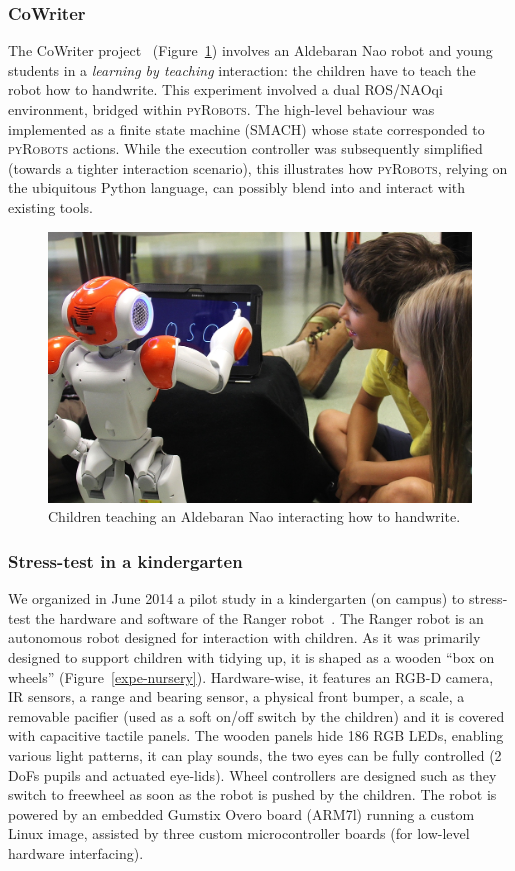 \documentclass[a4paper, 10pt, conference]{ieeeconf}      %
\newcommand{\pyRobots}{\textsc{pyRobots}}
\begin{document}
\subsubsection{CoWriter} The {\sc CoWriter} project~\cite{hood2015those}
(Figure~\ref{expe-cowriter}) involves an Aldebaran Nao robot and young students
in a \emph{learning by teaching} interaction: the children have to teach the
robot how to handwrite. This experiment involved a dual ROS/NAOqi environment,
bridged within \pyRobots{}. The high-level behaviour was implemented as a finite
state machine ({\sc SMACH}) whose state corresponded to \pyRobots{} actions.
While the execution controller was subsequently simplified (towards a tighter
interaction scenario), this illustrates how \pyRobots{}, relying on the
ubiquitous Python language, can possibly blend into and interact with existing
tools.

\begin{figure}
        \centering
        \includegraphics[width=0.9\columnwidth]{cowriter}
        \caption{Children teaching an Aldebaran Nao interacting how to
        handwrite.}
        \label{expe-cowriter}
\end{figure}

\subsubsection{Stress-test in a kindergarten}
\label{croq}

We organized in June 2014 a pilot study in a kindergarten (on campus) to
stress-test the hardware and software of the Ranger
robot~\cite{mondada2014ranger}. The Ranger robot is an autonomous robot designed
for interaction with children. As it was primarily designed to support children
with tidying up, it is shaped as a wooden ``box on wheels''
(Figure~\ref{expe-nursery}). Hardware-wise, it features an RGB-D camera, IR
sensors, a range and bearing sensor, a physical front bumper, a scale, a
removable pacifier (used as a soft on/off switch by the children) and it is
covered with capacitive tactile panels. The wooden panels hide 186 RGB LEDs,
enabling various light patterns, it can play sounds, the two eyes can be fully
controlled (2 DoFs pupils and actuated eye-lids). Wheel controllers are designed
such as they switch to freewheel as soon as the robot is pushed by the children.
The robot is powered by an embedded Gumstix Overo board (ARM7l) running a custom
Linux image, assisted by three custom microcontroller boards (for low-level
hardware interfacing).
\end{document}
